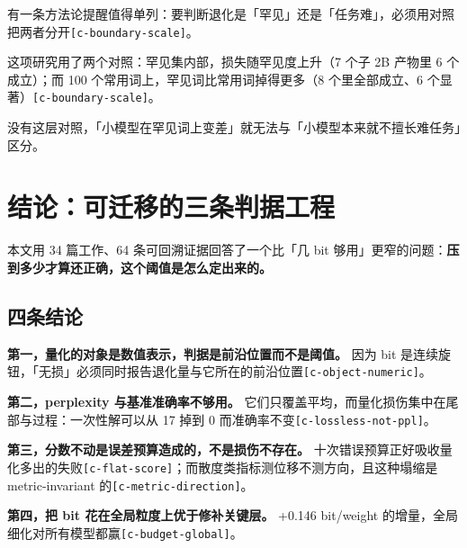 有一条方法论提醒值得单列：要判断退化是「罕见」还是「任务难」，必须用对照把两者分开{\scriptsize\texttt{[c-\hspace{0pt}boundary-\hspace{0pt}scale]}}。


这项研究用了两个对照：罕见集内部，损失随罕见度上升（7 个子 2B 产物里 6 个成立）；而 100 个常用词上，罕见词比常用词掉得更多（8 个里全部成立、6 个显著）{\scriptsize\texttt{[c-\hspace{0pt}boundary-\hspace{0pt}scale]}}。


没有这层对照，「小模型在罕见词上变差」就无法与「小模型本来就不擅长难任务」区分。


\section{结论：可迁移的三条判据工程}

本文用 34 篇工作、64 条可回溯证据回答了一个比「几 bit 够用」更窄的问题：\textbf{压到多少才算还正确，这个阈值是怎么定出来的。}


\subsection{四条结论}

\textbf{第一，量化的对象是数值表示，判据是前沿位置而不是阈值。} 因为 bit 是连续旋钮，「无损」必须同时报告退化量与它所在的前沿位置{\scriptsize\texttt{[c-\hspace{0pt}object-\hspace{0pt}numeric]}}。


\textbf{第二，perplexity 与基准准确率不够用。} 它们只覆盖平均，而量化损伤集中在尾部与过程：一次性解可以从 17 掉到 0 而准确率不变{\scriptsize\texttt{[c-\hspace{0pt}lossless-\hspace{0pt}not-\hspace{0pt}ppl]}}。


\textbf{第三，分数不动是误差预算造成的，不是损伤不存在。} 十次错误预算正好吸收量化多出的失败{\scriptsize\texttt{[c-\hspace{0pt}flat-\hspace{0pt}score]}}；而散度类指标测位移不测方向，且这种塌缩是 metric-invariant 的{\scriptsize\texttt{[c-\hspace{0pt}metric-\hspace{0pt}direction]}}。


\textbf{第四，把 bit 花在全局粒度上优于修补关键层。} +0.146 bit/weight 的增量，全局细化对所有模型都赢{\scriptsize\texttt{[c-\hspace{0pt}budget-\hspace{0pt}global]}}。


